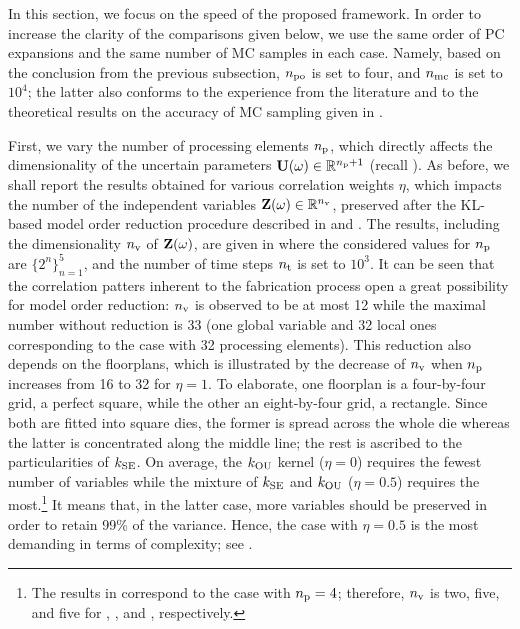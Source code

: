 In this section, we focus on the speed of the proposed framework.
In order to increase the clarity of the comparisons given below, we use the same order of PC expansions and the same number of MC samples in each case.
Namely, based on the conclusion from the previous subsection, ${n_\text{po}}$ is set to four, and ${n_\text{mc}}$ is set to $10^4$; the latter also conforms to the experience from the literature \cite{shen2009, bhardwaj2008, ghanta2006} and to the theoretical results on the accuracy of MC sampling given in \cite{diaz-emparanza2002}.

First, we vary the number of processing elements ${n_\text{p}}$, which directly affects the dimensionality of the uncertain parameters $\mathbf{U}(\omega) \in \mathbb{R}^{{n_\text{p}} + 1}$ (recall ).
As before, we shall report the results obtained for various correlation weights $\eta$, which impacts the number of the independent variables $\mathbf{Z}(\omega) \in \mathbb{R}^{n_\text{v}}$, preserved after the KL-based model order reduction procedure described in  and .
The results, including the dimensionality ${n_\text{v}}$ of $\mathbf{Z}(\omega)$, are given in  where the considered values for ${n_\text{p}}$ are $\{ 2^n \}_{n = 1}^5$, and the number of time steps ${n_\text{t}}$ is set to $10^3$.
It can be seen that the correlation patters inherent to the fabrication process \cite{cheng2011} open a great possibility for model order reduction: ${n_\text{v}}$ is observed to be at most 12 while the maximal number without reduction is 33 (one global variable and 32 local ones corresponding to the case with 32 processing elements).
This reduction also depends on the floorplans, which is illustrated by the decrease of ${n_\text{v}}$ when ${n_\text{p}}$ increases from 16 to 32 for $\eta = 1$.
To elaborate, one floorplan is a four-by-four grid, a perfect square, while the other an eight-by-four grid, a rectangle.
Since both are fitted into square dies, the former is spread across the whole die whereas the latter is concentrated along the middle line; the rest is ascribed to the particularities of $\fCorr_\SE$.
On average, the $\fCorr_\OU$ kernel ($\eta = 0$) requires the fewest number of variables while the mixture of $\fCorr_\SE$ and $\fCorr_\OU$ ($\eta = 0.5$) requires the most.\footnote{The results in  correspond to the case with ${n_\text{p}} = 4$; therefore, ${n_\text{v}}$ is two, five, and five for , , and , respectively.}
It means that, in the latter case, more variables should be preserved in order to retain 99\% of the variance.
Hence, the case with $\eta = 0.5$ is the most demanding in terms of complexity; see .

